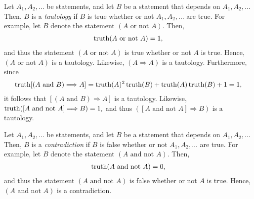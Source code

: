 Let $A_1,A_2,\ldots$ be statements, and let $B$ be a statement that depends on $A_1,A_2,\ldots$   Then, $B$ is a {\it tautology} if $B$ is true whether or not $A_1,A_2,\ldots$ are true.
%
%
%
For example, let $B$ denote the statement $(A\mbox{ or not } A).$  Then,
\begin{align}
%
\truth(A\mbox{ or not } A) = 1,
%
\end{align}
%
and thus the statement $(A\mbox{ or not } A)$ is true whether or not $A$ is true.  Hence, $(A\mbox{ or not } A)$ is a tautology.
%
%
Likewise, %
%
%
$(A\Longrightarrow A)$ is a tautology.
%
Furthermore, since
%
\begin{align}
%
\truth[(A\mbox{ and } B)\Longrightarrow A] = \truth(A)^2\truth(B)+\truth(A)\truth(B)+1=1,
%
\end{align}
%
it follows that $[(A\mbox{ and } B)\Longrightarrow A]$ is a tautology.
%
Likewise, $\operatorname{truth}([A\mbox{ and not }A]\Longrightarrow B)=1,$ and thus $([A\mbox{ and not }A]\Longrightarrow B)$ is a tautology.
%
%
%
%



%




Let $A_1,A_2,\ldots$ be statements, and let $B$ be a statement that depends on $A_1,A_2,\ldots$   Then, $B$ is a {\it contradiction} if $B$ is false whether or not $A_1,A_2,\ldots$ are true.
%
%
%
For example, let $B$ denote the statement $(A\mbox{ and not } A).$  Then,
%
\begin{align}
%
\truth(A\mbox{ and not } A) = 0,
%
\end{align}
%
and thus the statement $(A\mbox{ and not } A)$ is false whether or not $A$ is true.    Hence, $(A\mbox{ and not } A)$ is a contradiction.
%
%






%
%
%
%
%
%
%
%
%
%
%
%
%
%
%




